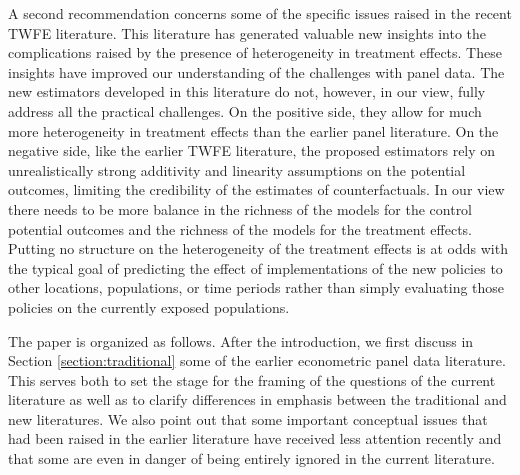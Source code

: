 \documentclass[letterpaper,12pt,leqno]{article}
\begin{document}
A second recommendation concerns 
some of the specific issues raised in the recent TWFE literature. This literature has generated valuable new insights into the complications raised by the presence of heterogeneity in treatment effects. These insights have improved our understanding of the challenges with panel data. The new estimators developed in this literature do not, however, in our view, fully address all the practical challenges. On the positive side, they allow for much more heterogeneity in treatment effects than the earlier panel literature.  On the negative side, like the earlier TWFE literature, the proposed estimators rely on unrealistically strong additivity and linearity assumptions on the potential outcomes, limiting the credibility of the estimates of counterfactuals. In our view there needs to be more balance in the richness of the models for the control potential outcomes and the richness of the models for the treatment effects. Putting no structure on the heterogeneity of the treatment effects is at odds with the typical goal of predicting the effect of implementations of the new policies to other locations, populations, or time periods rather than simply evaluating those policies on the currently exposed populations.


The paper is organized as follows.
After the introduction, we first discuss in Section \ref{section:traditional} some of the earlier econometric panel data literature. This serves both to set the stage for the framing of the questions of the current literature as well as to clarify differences in emphasis between the traditional and new literatures. We also point out that some important conceptual issues that had been raised in the earlier literature have received less attention recently and that some are even in danger of being entirely ignored in the current literature.
\end{document}
